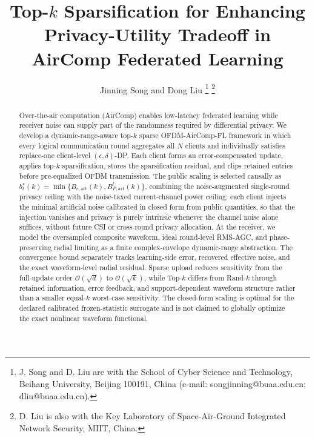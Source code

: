 \documentclass[journal]{IEEEtran}
\begin{document}
	\title{Top-$k$ Sparsification for Enhancing Privacy-Utility Tradeoff in AirComp Federated Learning}
\author{
Jinning Song and Dong Liu%
	\thanks{J. Song and D. Liu are with the School of Cyber Science and Technology,
	Beihang University, Beijing 100191, China (e-mail: songjinning@buaa.edu.cn;
	dliu@buaa.edu.cn).}%
	\thanks{D. Liu is also with the Key Laboratory of Space-Air-Ground
	Integrated Network Security, MIIT, China.}%
}

\maketitle

\begin{abstract}
Over-the-air computation (AirComp) enables low-latency federated learning while receiver noise can supply part of the randomness required by differential privacy. We develop a dynamic-range-aware top-$k$ sparse OFDM-AirComp-FL framework in which every logical communication round aggregates all $N$ clients and individually satisfies replace-one client-level $(\epsilon,\delta)$-DP. Each client forms an error-compensated update, applies top-$k$ sparsification, stores the sparsification residual, and clips retained entries before pre-equalized OFDM transmission. The public scaling is selected causally as $b_t^\star(k)=\min\{B_{\epsilon,\mathrm{art}}(k),B_{P,\mathrm{art}}^t(k)\}$, combining the noise-augmented single-round privacy ceiling with the noise-taxed current-channel power ceiling; each client injects the minimal artificial noise calibrated in closed form from public quantities, so that the injection vanishes and privacy is purely intrinsic whenever the channel noise alone suffices, without future CSI or cross-round privacy allocation. At the receiver, we model the oversampled composite waveform, ideal round-level RMS-AGC, and phase-preserving radial limiting as a finite complex-envelope dynamic-range abstraction. The convergence bound separately tracks learning-side error, recovered effective noise, and the exact waveform-level radial residual. Sparse upload reduces sensitivity from the full-update order $\mathcal O(\sqrt d)$ to $\mathcal O(\sqrt k)$, while Top-$k$ differs from Rand-$k$ through retained information, error feedback, and support-dependent waveform structure rather than a smaller equal-$k$ worst-case sensitivity. The closed-form scaling is optimal for the declared calibrated frozen-statistic surrogate and is not claimed to globally optimize the exact nonlinear waveform functional.
\end{abstract}
\end{document}
